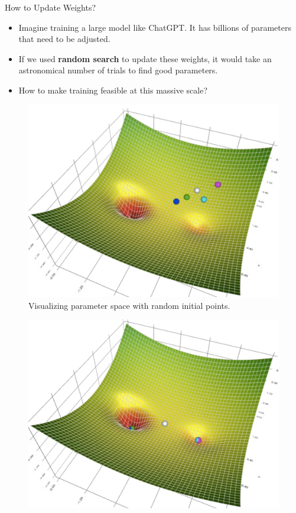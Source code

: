 \documentclass[serif, aspectratio=169]{beamer}
\begin{document}
\begin{frame}{How to Update Weights?}
    \begin{itemize}
        \item Imagine training a large model like ChatGPT. It has billions of parameters that need to be adjusted.
        \item If we used \textbf{random search} to update these weights, it would take an astronomical number of trials to find good parameters.
        \item How to make training feasible at this massive scale?
    \end{itemize}
    \begin{figure}[!htb]
  \begin{minipage}{0.3\textwidth}
     \centering
     \includegraphics[width=.9\linewidth]{pic/gd1.png}\\
            {\scriptsize Visualizing parameter space with random initial points.}
  \end{minipage}\hfill
    \begin{minipage}{0.3\textwidth}
     \centering
     \includegraphics[width=.9\linewidth]{pic/gd2.png}\\

\end{minipage}
\end{figure}
\end{frame}
\end{document}
